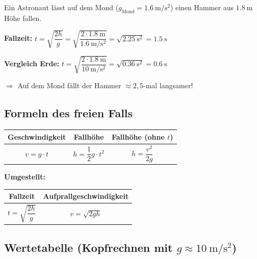 \documentclass[11pt, a4paper]{article}
\begin{document}
\begin{beispielbox}[title=Mondmission]
Ein Astronaut lässt auf dem Mond ($g_{\text{Mond}} = \SI{1,6}{\metre\per\second\squared}$) einen Hammer aus $\SI{1,8}{\metre}$ Höhe fallen.

\textbf{Fallzeit:} $t = \sqrt{\dfrac{2h}{g}} = \sqrt{\dfrac{2 \cdot \SI{1,8}{\metre}}{\SI{1,6}{\metre\per\second\squared}}} = \sqrt{\SI{2,25}{\second\squared}} = \SI{1,5}{\second}$

\textbf{Vergleich Erde:} $t = \sqrt{\dfrac{2 \cdot \SI{1,8}{\metre}}{\SI{10}{\metre\per\second\squared}}} = \sqrt{\SI{0,36}{\second\squared}} = \SI{0,6}{\second}$

$\Rightarrow$ Auf dem Mond fällt der Hammer $\approx 2,5$-mal langsamer!
\end{beispielbox}

\subsection{Formeln des freien Falls}

\begin{formelbox}[title=Formeln des freien Falls (Start aus Ruhe)]
\begin{center}
\renewcommand{\arraystretch}{2.2}
\begin{tabular}{|c|c|c|}
\hline
\textbf{Geschwindigkeit} & \textbf{Fallhöhe} & \textbf{Fallhöhe (ohne $t$)} \\
\hline
$v = g \cdot t$ & $h = \dfrac{1}{2} g \cdot t^2$ & $h = \dfrac{v^2}{2g}$ \\
\hline
\end{tabular}

\vspace{1em}

\textbf{Umgestellt:}

\begin{tabular}{|c|c|}
\hline
\textbf{Fallzeit} & \textbf{Aufprallgeschwindigkeit} \\
\hline
$t = \sqrt{\dfrac{2h}{g}}$ & $v = \sqrt{2gh}$ \\
\hline
\end{tabular}
\end{center}
\end{formelbox}

\subsection{Wertetabelle (Kopfrechnen mit $g \approx \SI{10}{\metre\per\second\squared}$)}
\end{document}
